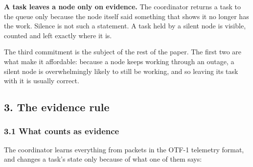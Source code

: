 \documentclass[
  12pt,
  letterpaper,
]{article}
\begin{document}
\textbf{A task leaves a node only on evidence.} The coordinator returns
a task to the queue only because the node itself said something that
shows it no longer has the work. Silence is not such a statement. A task
held by a silent node is visible, counted and left exactly where it is.

The third commitment is the subject of the rest of the paper. The first
two are what make it affordable: because a node keeps working through an
outage, a silent node is overwhelmingly likely to still be working, and
so leaving its task with it is usually correct.

\hypertarget{the-evidence-rule}{%
\subsection{3. The evidence rule}\label{the-evidence-rule}}

\hypertarget{what-counts-as-evidence}{%
\subsubsection{3.1 What counts as
evidence}\label{what-counts-as-evidence}}

The coordinator learns everything from packets in the OTF-1 telemetry
format, and changes a task's state only because of what one of them
says:
\end{document}

